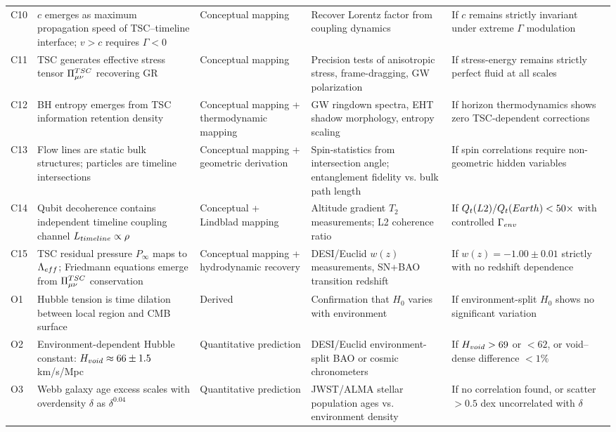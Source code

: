 \documentclass[11pt,a4paper]{article}
\let\text\relax \let\mathrm\relax \let\mathbf\relax \let\mathcal\relax
\begin{document}
\begin{longtable}{@{} l >{\RaggedRight\arraybackslash}p{4.1cm} >{\RaggedRight\arraybackslash}p{2.0cm} >{\RaggedRight\arraybackslash}p{2.6cm} >{\RaggedRight\arraybackslash}p{3.0cm} @{}}
C10 & $c$ emerges as maximum propagation speed of TSC--timeline interface; $v>c$ requires $\Gamma<0$ & Conceptual mapping & Recover Lorentz factor from coupling dynamics & If $c$ remains strictly invariant under extreme $\Gamma$ modulation \\
C11 & TSC generates effective stress tensor $\Pi_{\mu\nu}^{\text{TSC}}$ recovering GR & Conceptual mapping & Precision tests of anisotropic stress, frame-dragging, GW polarization & If stress-energy remains strictly perfect fluid at all scales \\
C12 & BH entropy emerges from TSC information retention density & Conceptual mapping + thermodynamic mapping & GW ringdown spectra, EHT shadow morphology, entropy scaling & If horizon thermodynamics shows zero TSC-dependent corrections \\
C13 & Flow lines are static bulk structures; particles are timeline intersections & Conceptual mapping + geometric derivation & Spin-statistics from intersection angle; entanglement fidelity vs. bulk path length & If spin correlations require non-geometric hidden variables \\
C14 & Qubit decoherence contains independent timeline coupling channel $\mathcal{L}_{\text{timeline}} \propto \rho$ & Conceptual + Lindblad mapping & Altitude gradient $T_2$ measurements; L2 coherence ratio & If $Q_t(\text{L2})/Q_t(\text{Earth}) < 50\times$ with controlled $\Gamma_{\text{env}}$ \\
C15 & TSC residual pressure $P_\infty$ maps to $\Lambda_{\text{eff}}$; Friedmann equations emerge from $\Pi_{\mu\nu}^{\text{TSC}}$ conservation & Conceptual mapping + hydrodynamic recovery & DESI/Euclid $w(z)$ measurements, SN+BAO transition redshift & If $w(z) = -1.00 \pm 0.01$ strictly with no redshift dependence \\
O1 & Hubble tension is time dilation between local region and CMB surface & Derived & Confirmation that $H_0$ varies with environment & If environment-split $H_0$ shows no significant variation \\
O2 & Environment-dependent Hubble constant: $H_{\text{void}} \approx 66 \pm 1.5$ km/s/Mpc & Quantitative prediction & DESI/Euclid environment-split BAO or cosmic chronometers & If $H_{\text{void}} > 69$ or $< 62$, or void--dense difference $< 1\%$ \\
O3 & Webb galaxy age excess scales with overdensity $\delta$ as $\delta^{0.04}$ & Quantitative prediction & JWST/ALMA stellar population ages vs. environment density & If no correlation found, or scatter $> 0.5$ dex uncorrelated with $\delta$ \\

\end{longtable}
\end{document}
